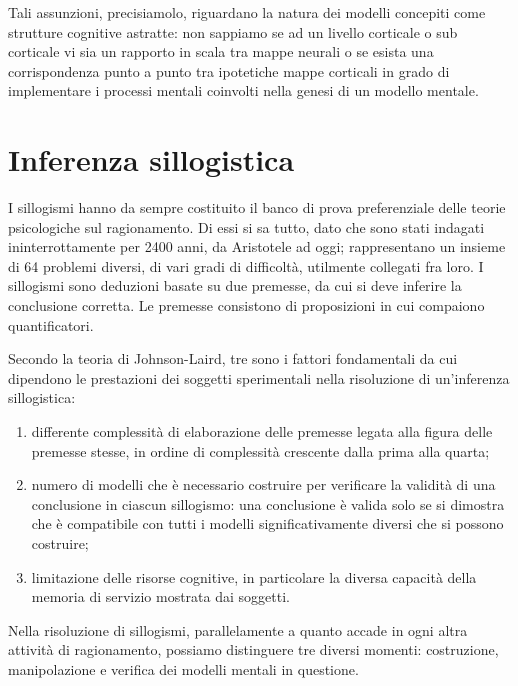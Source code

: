 Tali assunzioni, precisiamolo, riguardano la natura dei modelli concepiti come strutture cognitive astratte: non sappiamo se ad un livello corticale o sub corticale vi sia un rapporto in scala tra mappe neurali o se esista una corrispondenza punto a punto tra ipotetiche mappe corticali in grado di implementare i processi mentali coinvolti nella genesi di un modello mentale.

\section{Inferenza sillogistica}
I sillogismi hanno da sempre costituito il banco di prova preferenziale delle teorie psicologiche sul ragionamento. Di essi si sa tutto, dato che sono stati indagati ininterrottamente per 2400 anni, da Aristotele ad oggi; rappresentano un insieme di 64 problemi diversi, di vari gradi di difficoltà, utilmente collegati fra loro. I sillogismi sono deduzioni basate su due premesse, da cui si deve inferire la conclusione corretta. Le premesse consistono di proposizioni in cui compaiono quantificatori.

Secondo la teoria di Johnson-Laird, tre sono i fattori fondamentali da cui dipendono le prestazioni dei soggetti sperimentali nella risoluzione di un’inferenza sillogistica:

\begin{enumerate}
  \item differente complessità di elaborazione delle premesse legata alla figura delle premesse stesse, in ordine di complessità crescente dalla prima alla quarta;
  \item numero di modelli che è necessario costruire per verificare la validità di una conclusione in ciascun sillogismo: una conclusione è valida solo se si dimostra che è compatibile con tutti i modelli significativamente diversi che si possono costruire;
  \item limitazione delle risorse cognitive, in particolare la diversa capacità della memoria di servizio mostrata dai soggetti.
\end{enumerate}

Nella risoluzione di sillogismi, parallelamente a quanto accade in ogni altra attività di ragionamento, possiamo distinguere tre diversi momenti: costruzione, manipolazione e verifica dei modelli mentali in questione.

